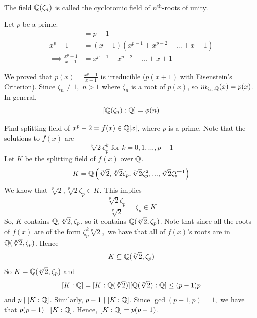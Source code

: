 \begin{definition} \leavevmode \\
    The field $\mathbb{Q}(\zeta_n)$ is called the cyclotomic field of $n^\text{th}$-roots of unity.
\end{definition}

Let $p$ be a prime.
\begin{align*}
    [\Q(\zeta_p) : \Q] &= p-1 \\
    x^p - 1 &= (x-1)(x^{p-1}+x^{p-2} + ... + x + 1) \\ 
    \implies \frac{x^p-1}{x-1} &= x^{p-1}+x^{p-2} + ... + x + 1
\end{align*}

We proved that $p(x) = \frac{x^p-1}{x-1}$ is irreducible ($p(x+1)$ with Eisenstein's Criterion). Since $\zeta_n \neq 1,$ $n > 1$ where $\zeta_n$ is a root of $p(x)$, so $m_{\zeta_n, \mathbb{Q}}(x) = p(x)$. In general,
$$[\mathbb{Q}(\zeta_n) : \mathbb{Q}] = \phi(n)$$

\begin{example}
    Find splitting field of $x^p - 2 = f(x) \in \mathbb{Q}[x]$, where $p$ is a prime. Note that the solutions to $f(x)$ are 
    $$\sqrt[p]{2} \zeta_p^k \text{ for } k= 0, 1, ..., p-1$$
    Let $K$ be the splitting field of $f(x)$ over $\mathbb{Q}$.
    $$K = \mathbb{Q}\left(\sqrt[p]{2}, \sqrt[p]{2}\zeta_p, \sqrt[p]{2}\zeta_p^2, ..., \sqrt[p]{2}\zeta_p^{p-1}\right)$$
    We know that $\sqrt[p]{2}, \sqrt[p]{2}\zeta_p \in K$. This implies
    $$\dfrac{\sqrt[p]{2}\zeta_p}{\sqrt[p]{2}} = \zeta_p \in K$$
    So, $K$ contains $\mathbb{Q}, \sqrt[p]{2}, \zeta_p$, so it contains $\mathbb{Q}(\sqrt[p]{2},\zeta_p)$. Note that since all the roots of $f(x)$ are of the form $\zeta_p^k \sqrt[p]{2},$ we have that all of $f(x)$'s roots are in $\mathbb{Q}(\sqrt[p]{2},\zeta_p)$. Hence
    $$K\subseteq \mathbb{Q}(\sqrt[p]{2},\zeta_p)$$
    So $K = \mathbb{Q}(\sqrt[p]{2},\zeta_p)$ and
    $$[K : \mathbb{Q}] = [K : \mathbb{Q}(\sqrt[p]{2})][\mathbb{Q}(\sqrt[p]{2}): \mathbb{Q}] \leq (p-1)p$$
    and $p \mid [K : \mathbb{Q}]$. Similarly, $p-1 \mid [K : \mathbb{Q}]$. Since $\gcd(p-1,p) = 1,$ we have that $p(p-1) \mid [K : \mathbb{Q}]$. Hence, $[K : \mathbb{Q}] = p(p-1)$.
\end{example}